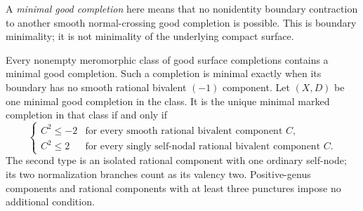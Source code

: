 A \emph{minimal good completion} here means that no nonidentity
boundary contraction to another smooth normal-crossing good
completion is possible. This is boundary minimality; it is not
minimality of the underlying compact surface.

\begin{theorem}\label{P3a-minimal}
Every nonempty meromorphic class of good surface completions
contains a minimal good completion. Such a completion is minimal
exactly when its boundary has no smooth rational bivalent
$(-1)$ component. Let $(X,D)$ be one minimal good completion
in the class. It is the unique minimal marked completion in
that class if and only if
\[
 \begin{cases}
 C^2\leq-2 &\text{for every smooth rational bivalent component }C,\\
 C^2\leq 2 &\text{for every singly self-nodal rational bivalent
                    component }C.
 \end{cases}
\]
The second type is an isolated rational component with one
ordinary self-node; its two normalization branches count as
its valency two. Positive-genus components and rational
components with at least three punctures impose no additional
condition.
\end{theorem}
